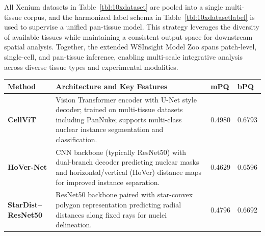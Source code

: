 \documentclass[sn-mathphys-num]{sn-jnl}%
\theoremstyle{thmstyleone}%
\theoremstyle{thmstyletwo}%
\theoremstyle{thmstylethree}%
\begin{document}
	
	All Xenium datasets in Table~\ref{tbl:10xdataset} are pooled into a single multi-tissue corpus, and the harmonized label schema in Table~\ref{tbl:10xdatasetlabel} is used to supervise a unified pan-tissue model. This strategy leverages the diversity of available tissues while maintaining a consistent output space for downstream spatial analysis. Together, the extended WSInsight Model Zoo spans patch-level, single-cell, and pan-tissue inference, enabling multi-scale integrative analysis across diverse tissue types and experimental modalities.
	
		\begin{table}[tb!]%
		\centering%
		\scriptsize%
		\begin{tabular}{p{2.9cm} p{7cm} p{0.75cm} p{0.75cm}}%
			\toprule%
			\textbf{Method} & \textbf{Architecture and Key Features} & \textbf{mPQ} & \textbf{bPQ} \\
			\midrule%
			\textbf{CellViT} \cite{Horst:2024} &
			Vision Transformer encoder with U-Net style decoder; trained on multi-tissue datasets including PanNuke; supports multi-class nuclear instance segmentation and classification. &
			0.4980 & 0.6793 \\
			\midrule%
			\textbf{HoVer-Net} \cite{Graham:2019} &
			CNN backbone (typically ResNet50) with dual-branch decoder predicting nuclear masks and horizontal/vertical (HoVer) distance maps for improved instance separation. &
			0.4629 & 0.6596 \\
			\midrule%
			\textbf{StarDist–ResNet50} \cite{Schmidt:2018, He:2016} &
			ResNet50 backbone paired with star-convex polygon representation predicting radial distances along fixed rays for nuclei delineation. &
			0.4796 & 0.6692 \\
			\bottomrule%
		\end{tabular}%
		\label{tab:wsinsight_models}%
	\end{table}%
	
%
\end{document}

